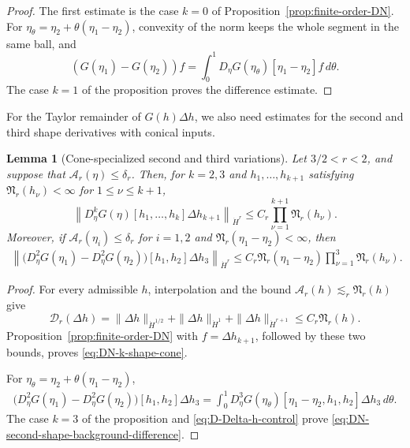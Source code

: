 \documentclass[12pt]{amsart}
\newtheorem{lemma}[theorem]{Lemma}
\theoremstyle{remark}
\theoremstyle{definition}
\numberwithin{equation}{section}
\begin{document}
\begin{proof}
The first estimate is the case \(k=0\) of
Proposition~\ref{prop:finite-order-DN}.  For
\(\eta_\theta=\eta_2+\theta(\eta_1-\eta_2)\), convexity of the norm keeps
the whole segment in the same ball, and
\[
 (G(\eta_1)-G(\eta_2))f
 =\int_0^1D_\eta G(\eta_\theta)[\eta_1-\eta_2]f\,d\theta.
\]
The case \(k=1\) of the proposition proves the difference estimate.
\end{proof}

For the Taylor remainder of \(G(h)\Delta h\), we also need estimates for
the second and third shape derivatives with conical inputs.

\begin{lemma}[Cone-specialized second and third variations]
\label{lem:DN-second-shape-revised}
Let \(3/2<r<2\), and suppose that
\(\mathcal A_r(\eta)\leq\delta_r\).
Then, for \(k=2,3\) and \(h_1,\ldots,h_{k+1}\) satisfying
\(\mathfrak N_r(h_\nu)<\infty\) for \(1\leq\nu\leq k+1\),
\begin{equation}
\label{eq:DN-k-shape-cone}
 \left\| D_\eta^kG(\eta) [h_1,\ldots,h_k]\Delta h_{k+1} \right\|_{\dot H^r} \leq C_r \prod_{\nu=1}^{k+1}\mathfrak N_r(h_\nu).
\end{equation}
Moreover, if \(\mathcal A_r(\eta_i)\leq\delta_r\) for \(i=1,2\) and \(\mathfrak N_r(\eta_1-\eta_2)<\infty\), then
\begin{align}
\label{eq:DN-second-shape-background-difference}
 \left\| \bigl( D_\eta^2G(\eta_1)-D_\eta^2G(\eta_2) \bigr) [h_1,h_2]\Delta h_3 \right\|_{\dot H^r}\leq C_r \mathfrak N_r(\eta_1-\eta_2) \prod_{\nu=1}^3\mathfrak N_r(h_\nu).
\end{align}
\end{lemma}

\begin{proof}
For every admissible \(h\), interpolation and the bound
\(\mathcal A_r(h)\lesssim_r\mathfrak N_r(h)\) give
\begin{equation} \label{eq:D-Delta-h-control}
 \mathcal D_r(\Delta h) = \|\Delta h\|_{\dot H^{1/2}} +\|\Delta h\|_{\dot H^1} +\|\Delta h\|_{\dot H^{r+1}}\leq C_r\mathfrak N_r(h). 
\end{equation}
Proposition~\ref{prop:finite-order-DN} with
\(f=\Delta h_{k+1}\), followed by these two bounds, proves
\eqref{eq:DN-k-shape-cone}.

For \(\eta_\theta=\eta_2+\theta(\eta_1-\eta_2)\),
\begin{align*}
 \bigl(D_\eta^2G(\eta_1)-D_\eta^2G(\eta_2)\bigr)[h_1,h_2]\Delta h_3
 =\int_0^1D_\eta^3G(\eta_\theta)
 [\eta_1-\eta_2,h_1,h_2]\Delta h_3\,d\theta.
\end{align*}
The case \(k=3\) of the proposition and
\eqref{eq:D-Delta-h-control} prove
\eqref{eq:DN-second-shape-background-difference}.
\end{proof}
\end{document}
